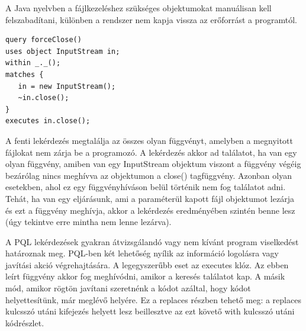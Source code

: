 \documentclass[a4paper,12pt]{report}
\begin{document}
A Java nyelvben a fájlkezeléshez szükséges objektumokat manuálisan kell felszabadítani, különben a rendszer nem kapja vissza az erőforrást a programtól.
\begin{verbatim}
query forceClose()
uses object InputStream in;
within _._();
matches {
   in = new InputStream();
   ~in.close();
}
executes in.close();
\end{verbatim} 
\par A fenti lekérdezés megtalálja az összes olyan függvényt, amelyben a megnyitott fájlokat nem zárja be a programozó. A lekérdezés akkor ad találatot, ha van egy olyan függvény, amiben van egy InputStream objektum viszont a függvény végéig bezárólag nincs meghívva az objektumon a close() tagfüggvény. Azonban olyan esetekben, ahol ez egy függvényhíváson belül történik nem fog találatot adni. Tehát, ha van egy eljárásunk, ami a paraméterül kapott fájl objektumot lezárja és ezt a függvény meghívja, akkor a lekérdezés eredményében szintén benne lesz (úgy tekintve erre mintha nem lenne lezárva).
\par A PQL lekérdezések gyakran átvizsgálandó vagy nem kívánt program viselkedést határoznak meg. PQL-ben két lehetőség nyílik az információ logolásra vagy javítási akció végrehajtására. A legegyszerűbb eset az executes klóz. Az ebben leírt függvény akkor fog meghívódni, amikor a keresés találatot kap. A másik mód, amikor rögtön javítani szeretnénk a kódot azáltal, hogy kódot helyettesítünk, már meglévő helyére. Ez a replaces részben tehető meg: a replaces kulcsszó utáni kifejezés helyett lesz beillesztve az ezt követő with kulcsszó utáni kódrészlet.
\end{document}
